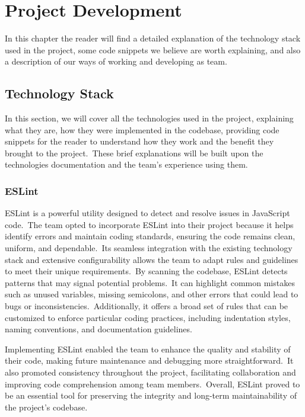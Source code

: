 \chapter{Project Development}\label{ch:project-development}

In this chapter the reader will find a detailed explanation of the technology stack used in the project, some code snippets we believe are worth explaining, and also a description of our ways of working and developing as team.

\section{Technology Stack}\label{sec:tecnology-stack}

In this section, we will cover all the technologies used in the project, explaining what they are, how they were implemented in the codebase, providing code snippets for the reader to understand how they work and the benefit they brought to the project.\ These brief explanations will be built upon the technologies documentation and the team's experience using them.

\subsection{ESLint}\label{subsec:eslint}

ESLint is a powerful utility designed to detect and resolve issues in JavaScript code.\ The team opted to incorporate ESLint into their project because it helps identify errors and maintain coding standards, ensuring the code remains clean, uniform, and dependable.\ Its seamless integration with the existing technology stack and extensive configurability allows the team to adapt rules and guidelines to meet their unique requirements.\ By scanning the codebase, ESLint detects patterns that may signal potential problems.\ It can highlight common mistakes such as unused variables, missing semicolons, and other errors that could lead to bugs or inconsistencies.\ Additionally, it offers a broad set of rules that can be customized to enforce particular coding practices, including indentation styles, naming conventions, and documentation guidelines.\cite[ESLint]{eslint}

Implementing ESLint enabled the team to enhance the quality and stability of their code, making future maintenance and debugging more straightforward.\ It also promoted consistency throughout the project, facilitating collaboration and improving code comprehension among team members.\ Overall, ESLint proved to be an essential tool for preserving the integrity and long-term maintainability of the project's codebase.

